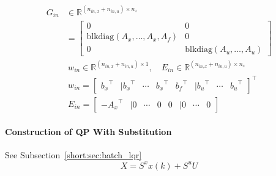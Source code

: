 \begin{align*}
    G_{in} & \in \mathbb{R}^{(n_{in,x}+n_{in,u})\times n_z} \\
           & =\left[
        \begin{array}{c|c} %
            0                                     & 0                                \\
            \hline %
            \text{blkdiag}(A_x, \ldots, A_x, A_f) & 0                                \\
            \hline %
            0                                     & \text{blkdiag}(A_u, \ldots, A_u)
        \end{array}
        \right]
\end{align*}
\begin{align*}
     & w_{in}\in \mathbb{R}^{(n_{in,x}+n_{in,u})\times 1}, \quad E_{in} \in \mathbb{R}^{(n_{in,x}+n_{in,u})\times n_x} \\
     & w_{in} = \begin{bmatrix}
                    {b_x                    }^\top &
                    | {b_x                  }^\top &
                    \cdots                         &
                    {b_x                    }^\top &
                    {b_f                    }^\top &
                    |{b_u }^\top                   &
                    \cdots                         &
                    {b_u                    }^\top
                \end{bmatrix}^\top                                                                       \\
     & E_{in} =\begin{bmatrix}
                   {-A_x}^\top &
                   |0          &
                   \cdots      &
                   0           &
                   0           &
                   |0          &
                   \cdots      &
                   0
               \end{bmatrix}
\end{align*}

\paragraph{Construction of QP With Substitution}
See Subsection~\ref{short:sec:batch_lqr}
\begin{equation*}
    X = S^x x(k) + S^u U
\end{equation*}

